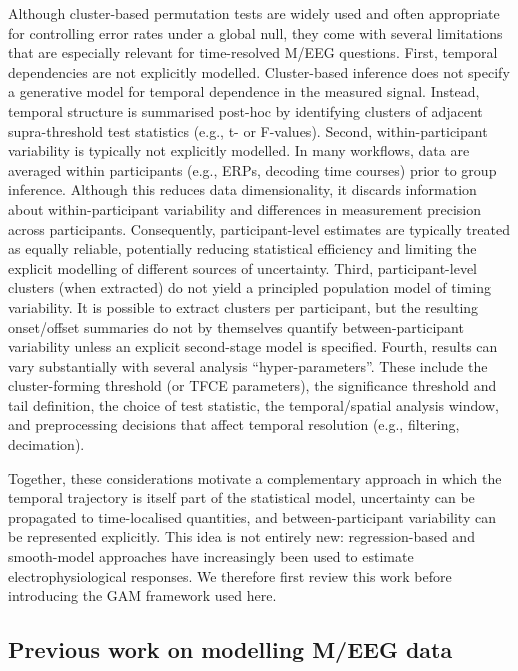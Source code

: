 \documentclass[
  doc,
  floatsintext,
  longtable,
  a4paper,
  nolmodern,
  notxfonts,
  notimes,
  colorlinks=true,linkcolor=blue,citecolor=blue,urlcolor=blue]{apa7}
\begin{document}
Although cluster-based permutation tests are widely used and often
appropriate for controlling error rates under a global null, they come
with several limitations that are especially relevant for time-resolved
M/EEG questions. First, temporal dependencies are not explicitly
modelled. Cluster-based inference does not specify a generative model
for temporal dependence in the measured signal. Instead, temporal
structure is summarised post-hoc by identifying clusters of adjacent
supra-threshold test statistics (e.g., t- or F-values). Second,
within-participant variability is typically not explicitly modelled. In
many workflows, data are averaged within participants (e.g., ERPs,
decoding time courses) prior to group inference. Although this reduces
data dimensionality, it discards information about within-participant
variability and differences in measurement precision across
participants. Consequently, participant-level estimates are typically
treated as equally reliable, potentially reducing statistical efficiency
and limiting the explicit modelling of different sources of uncertainty.
Third, participant-level clusters (when extracted) do not yield a
principled population model of timing variability. It is possible to
extract clusters per participant, but the resulting onset/offset
summaries do not by themselves quantify between-participant variability
unless an explicit second-stage model is specified. Fourth, results can
vary substantially with several analysis ``hyper-parameters''. These
include the cluster-forming threshold (or TFCE parameters), the
significance threshold and tail definition, the choice of test
statistic, the temporal/spatial analysis window, and preprocessing
decisions that affect temporal resolution (e.g., filtering, decimation).

Together, these considerations motivate a complementary approach in
which the temporal trajectory is itself part of the statistical model,
uncertainty can be propagated to time-localised quantities, and
between-participant variability can be represented explicitly. This idea
is not entirely new: regression-based and smooth-model approaches have
increasingly been used to estimate electrophysiological responses. We
therefore first review this work before introducing the GAM framework
used here.

\subsection{Previous work on modelling M/EEG
data}\label{previous-work-on-modelling-meeg-data}
\end{document}
